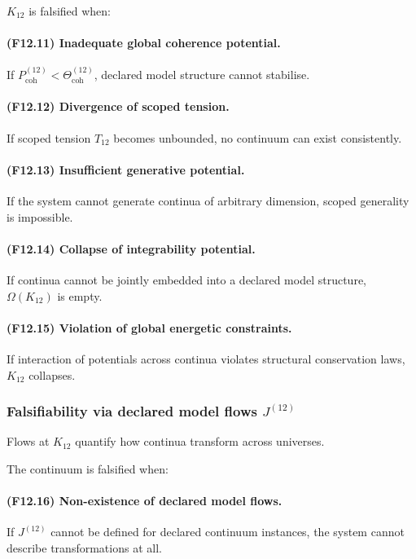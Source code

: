 $K_{12}$ is falsified when:

\paragraph{(F12.11) Inadequate global coherence potential.}
If $P_{\mathrm{coh}}^{(12)} < \Theta_{\mathrm{coh}}^{(12)}$,  
declared model structure cannot stabilise.

\paragraph{(F12.12) Divergence of scoped tension.}
If scoped tension $T_{12}$ becomes unbounded,  
no continuum can exist consistently.

\paragraph{(F12.13) Insufficient generative potential.}
If the system cannot generate continua of arbitrary dimension,
scoped generality is impossible.

\paragraph{(F12.14) Collapse of integrability potential.}
If continua cannot be jointly embedded into a declared model structure,
$\Omega(K_{12})$ is empty.

\paragraph{(F12.15) Violation of global energetic constraints.}
If interaction of potentials across continua violates structural
conservation laws, $K_{12}$ collapses.



\subsubsection{Falsifiability via declared model flows $J^{(12)}$}

Flows at $K_{12}$ quantify how continua transform across universes.

The continuum is falsified when:

\paragraph{(F12.16) Non-existence of declared model flows.}
If $J^{(12)}$ cannot be defined for declared continuum instances,
the system cannot describe transformations at all.

